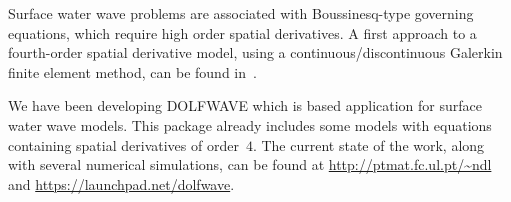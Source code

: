Surface water wave problems are associated with Boussinesq-type
governing equations, which require high order spatial derivatives. A
first approach to a fourth-order spatial derivative model, using a
continuous/discontinuous Galerkin finite element method, can be found
in~\citet{LopesPereiraTrabucho}.

We have been developing DOLFWAVE which is \fenics based application
for surface water wave models. This package already includes some
models with equations containing spatial derivatives of order~$4$.
The current state of the work, along with several numerical
simulations, can be found at \url{http://ptmat.fc.ul.pt/~ndl} and
\url{https://launchpad.net/dolfwave}.
